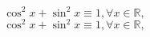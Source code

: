 \documentclass[12pt]{article}
\begin{document}
	\begin{equation}
		{\cos^2{x}}+{\sin^2{x}} \equiv 1, \forall x \in \mathbb{R},	
	\end{equation}
	\begin{equation}
		{\cos^2{x}}+{\sin^2{x}} \equiv 1, \forall x \in \mathbb{R},
	\end{equation}
\end{document}

